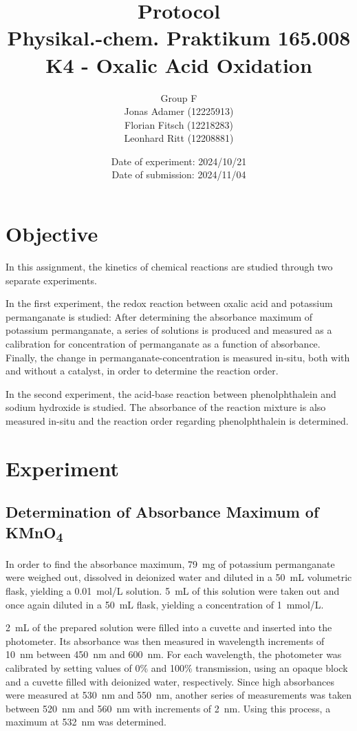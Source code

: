 \documentclass[titlepage]{article}
\title{Protocol \\ Physikal.-chem. Praktikum 165.008 \\ K4 - Oxalic Acid Oxidation}
\author{Group F\\Jonas Adamer (12225913)\\Florian Fitsch (12218283)\\Leonhard Ritt (12208881)}
\date{Date of experiment: 2024/10/21\\Date of submission: 2024/11/04}
\begin{document}
\maketitle
\thispagestyle{empty}

\newpage
\tableofcontents
\thispagestyle{empty}

\addtocounter{page}{-1}

\newpage
\section{Objective}
In this assignment, the kinetics of chemical reactions are studied through two separate experiments.

In the first experiment, the redox reaction between oxalic acid and potassium permanganate is studied: After determining the absorbance maximum of potassium permanganate, a series of solutions is produced and measured as a calibration for concentration of permanganate as a function of absorbance. Finally, the change in permanganate-concentration is measured in-situ, both with and without a catalyst, in order to determine the reaction order.

In the second experiment, the acid-base reaction between phenolphthalein and sodium hydroxide is studied. The absorbance of the reaction mixture is also measured in-situ and the reaction order regarding phenolphthalein is determined.

\section{Experiment}
\subsection{Determination of Absorbance Maximum of KMnO\texorpdfstring{\textsubscript{4}}{4}} \label{ssec_experiment_abs_maximum}
In order to find the absorbance maximum, 79~mg of potassium permanganate were weighed out, dissolved in deionized water and diluted in a 50~mL volumetric flask, yielding a 0.01~mol/L solution. 5~mL of this solution were taken out and once again diluted in a 50~mL flask, yielding a concentration of 1~mmol/L.

2~mL of the prepared solution were filled into a cuvette and inserted into the photometer. Its absorbance was then measured in wavelength increments of 10~nm between 450~nm and 600~nm. For each wavelength, the photometer was calibrated by setting values of 0\% and 100\% transmission, using an opaque block and a cuvette filled with deionized water, respectively. Since high absorbances were measured at 530~nm and 550~nm, another series of measurements was taken between 520~nm and 560~nm with increments of 2~nm. Using this process, a maximum at 532~nm was determined.
\end{document}
